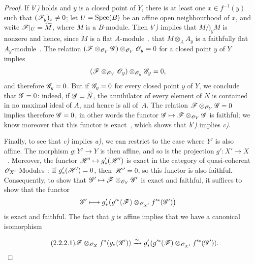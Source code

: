 \begin{proof}
If \emph{b$'$)} holds and $y$ is a closed point of $Y$, there is at least one $x\in f^{-1}(y)$ such that $(\mathscr{F}_y)_x\neq 0$; let $U=\operatorname{Spec}(B)$ be an affine open neighbourhood of $x$, and write $\mathscr{F}|_U=\widetilde{M}$, where $M$ is a $B$-module.
Then \emph{b$'$)} implies that $M/\mathfrak{j}_yM$ is nonzero and hence, since $M$ is a flat $A$-module~, that $M\otimes_A A_y$ is a faithfully flat $A_y$-module~.
The relation $(\mathscr{F}\otimes_{\mathscr{O}_Y}\mathscr{G})\otimes_{\mathscr{O}_Y}\mathscr{O}_y=0$ for a closed point $y$ of $Y$ implies
\[
  (\mathscr{F}\otimes_{\mathscr{O}_Y}\mathscr{O}_y)\otimes_{\mathscr{O}_y}\mathscr{G}_y=0,
\]
and therefore $\mathscr{G}_y=0$.
But if $\mathscr{G}_y=0$ for every closed point $y$ of $Y$, we conclude that $\mathscr{G}=0$: indeed, if $\mathscr{G}=\widetilde{N}$, the annihilator of every element of $N$ is contained in no maximal ideal of $A$, and hence is all of~$A$.
The relation $\mathscr{F}\otimes_{\mathscr{O}_Y}\mathscr{G}=0$ implies therefore $\mathscr{G}=0$, in other words the functor $\mathscr{G}\mapsto\mathscr{F}\otimes_{\mathscr{O}_Y}\mathscr{G}$ is faithful; we know moreover that this functor is exact~, which shows that \emph{b$'$)} implies \emph{c)}.

Finally, to see that \emph{c)} implies \emph{a)}, we can restrict to the case where $Y'$ is also affine.
The morphism $g:Y'\to Y$ is then affine, and so is the projection $g':X'\to X$~.
Moreover, the functor $\mathscr{H}'\mapsto g'_*(\mathscr{H}')$ is exact in the category of quasi-coherent $\mathscr{O}_{X'}$-Modules~; if $g'_*(\mathscr{H}')=0$, then $\mathscr{H}'=0$, so this functor is also faithful.
Consequently, to show that $\mathscr{G}'\mapsto\mathscr{F}\otimes_{\mathscr{O}_Y}\mathscr{G}'$ is exact and faithful, it suffices to show that the functor
\[
  \mathscr{G}'\longmapsto
  g'_*\bigl(g'^*(\mathscr{F})\otimes_{\mathscr{O}_{X'}}f'^*(\mathscr{G}')\bigr)
\]
is exact and faithful.
The fact that $g$ is affine implies that we have a canonical isomorphism

\begin{equation}
\tag{2.2.2.1}
\label{IV.2.2.2.1}
  \mathscr{F}\otimes_{\mathscr{O}_X}f^*(g_*(\mathscr{G}'))\xrightarrow{\sim} g'_*(g'^*(\mathscr{F})\otimes_{\mathscr{O}_{X'}}f'^*(\mathscr{G}')).
\end{equation}


\end{proof}
